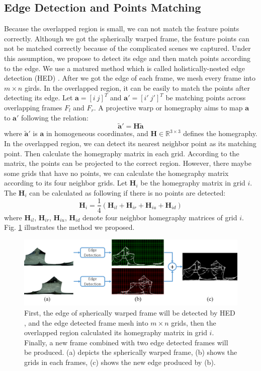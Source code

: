\documentclass[conference]{IEEEtran}
\begin{document}
\subsection{Edge Detection and Points Matching}
\label{ssec:edge-detection}
Because the overlapped region is small, we can not match the feature points correctly. Although we got the spherically warped frame, the feature points can not be
matched correctly because of the complicated scenes we captured. Under this assumption, we propose to detect its edge and then match points according to the edge.
We use a matured method which is called holistically-nested edge detection (HED) \cite{xie2015holistically}. After we got the edge of each frame, we mesh every frame into $m \times n$
girds. In the overlapped region, it can be easily to match the points after detecting its edge. Let $\textbf{a} = [i \ j]^T$ and $\textbf{a}' = [i' \ j']^T$ be matching points
across overlapping frames $F_l$ and $F_r$. A projective warp or homegraphy aims to map $\textbf{a}$ to $\textbf{a}'$ following the relation:
\begin{equation}
\widetilde{\textbf{a}}'=\textbf{H}\widetilde{\textbf{a}}
\end{equation}
where $\widetilde{\textbf{a}}'$ is $\textbf{a}$ in homogeneous coordinates, and $\textbf{H}\in\mathbb{R}^{3 \times 3}$ defines the homegraphy. In the overlapped region,
we can detect its nearest neighbor point as its matching point. Then calculate the homegraphy matrix in each grid. According to the matrix, the points can be projected to the correct region.
However, there maybe some grids that have no points, we can calculate the homegraphy matrix according to its four neighbor grids. Let $\textbf{H}_i$ be the homegraphy matrix in grid $i$.
The $\textbf{H}_{i}$ can be calculated as following if there is no points are detected:
\begin{equation}
\textbf{H}_{i} = \frac{1}{4}\left(\textbf{H}_{il}+\textbf{H}_{ir}+\textbf{H}_{iu}+\textbf{H}_{id}\right)
\end{equation} 
where $\textbf{H}_{il}$, 
$\textbf{H}_{ir}$, 
$\textbf{H}_{iu}$, 
$\textbf{H}_{id}$ 
denote four neighbor homegraphy matrices of grid $i$.
Fig. \ref{fig:p8} illustrates the method we proposed.
\begin{figure}[!htpb]
\centering
\includegraphics[scale=0.22]{picture41.png}
\caption{First, the edge of spherically warped frame will be detected by HED \cite{xie2015holistically}, and the edge detected frame mesh into $m \times n$ grids, 
then the overlapped region calculated its homegraphy matrix in grid $i$.
Finally, a new frame combined with two edge detected frames will be produced. (a) depicts the spherically
warped frame, (b) shows the grids in each frames, (c) shows the new edge produced by (b).}
\label{fig:p8}
\end{figure}
\end{document}
